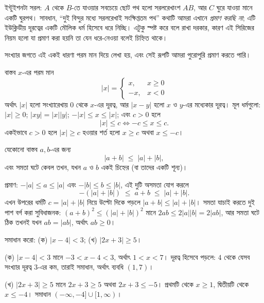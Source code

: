 \documentclass[11pt]{article}
\begin{document}
ইন্টুইশনটা সরল: $A$ থেকে $B$-তে যাওয়ার সবচেয়ে ছোট পথ হলো সরলরেখাংশ $AB$, আর
$C$ ঘুরে যাওয়া মানে একটি ঘুরপথ। সাবধান, ``দুই বিন্দুর মধ্যে সরলরেখাই সংক্ষিপ্ততম
পথ'' কথাটি আমরা এখানে \emph{প্রমাণ করছি না}; এটি ইউক্লিডীয় দূরত্বের একটি মৌলিক
ধর্ম হিসেবে ধরে নিচ্ছি। এটুকু স্পষ্ট করে বলে রাখা দরকার, কারণ এই সিরিজের নিয়ম
হলো যা প্রমাণ করা হয়নি তা যেন ধরে-নেওয়া বলেই চিহ্নিত থাকে।

সংখ্যার জগতে এই একই ধারণা পরম মান দিয়ে লেখা হয়, এবং সেই রূপটি আমরা পুরোপুরি
প্রমাণ করতে পারি।

\begin{idea}[পরম মান]
বাস্তব $x$-এর পরম মান
\[
  |x| = \begin{cases} x, & x \geq 0 \\ -x, & x < 0 \end{cases}
\]
অর্থাৎ $|x|$ হলো সংখ্যারেখায় $0$ থেকে $x$-এর দূরত্ব, আর $|x - y|$ হলো $x$ ও
$y$-এর মধ্যেকার দূরত্ব। মূল ধর্মগুলো: $|x| \geq 0$; $|xy| = |x||y|$;
$-|x| \leq x \leq |x|$; এবং $c > 0$ হলে
\[
  |x| \leq c \iff -c \leq x \leq c .
\]
একইভাবে $c > 0$ হলে $|x| \geq c$ হওয়ার শর্ত হলো $x \geq c$ অথবা $x \leq -c$।
\end{idea}

\begin{idea}
যেকোনো বাস্তব $a, b$-এর জন্য
\[
  |a + b| \;\leq\; |a| + |b| ,
\]
এবং সমতা ঘটে কেবল তখন, যখন $a$ ও $b$ একই চিহ্নের (বা তাদের একটি শূন্য)।
\end{idea}

প্রমাণ: $-|a| \leq a \leq |a|$ এবং $-|b| \leq b \leq |b|$, এই দুটি অসমতা যোগ
করলে
\[
  -\left( |a| + |b| \right) \;\leq\; a + b \;\leq\; |a| + |b| .
\]
এখন উপরের ধর্মটি $c = |a| + |b|$ নিয়ে উল্টো দিকে পড়লে $|a+b| \leq |a| + |b|$।
সমতা যাচাই করতে দুই পাশ বর্গ করা সুবিধাজনক: $(a+b)^2 \leq (|a|+|b|)^2$ মানে
$2ab \leq 2|a||b| = 2|ab|$, আর সমতা ঘটে ঠিক তখনই যখন $ab = |ab|$, অর্থাৎ
$ab \geq 0$।

\begin{example}
সমাধান করো: (ক) $|x - 4| < 3$; (খ) $|2x + 3| \geq 5$।
\end{example}

\begin{solbox}
(ক) $|x-4| < 3$ মানে $-3 < x - 4 < 3$, অর্থাৎ $1 < x < 7$। দূরত্ব হিসেবে পড়লে:
$4$ থেকে যেসব সংখ্যার দূরত্ব $3$-এর কম, তারাই সমাধান, অর্থাৎ ব্যবধি $(1,7)$।

(খ) $|2x+3| \geq 5$ মানে $2x + 3 \geq 5$ অথবা $2x + 3 \leq -5$। প্রথমটি থেকে
$x \geq 1$, দ্বিতীয়টি থেকে $x \leq -4$। সমাধান
$(-\infty, -4] \cup [1, \infty)$।
\end{solbox}
\end{document}
